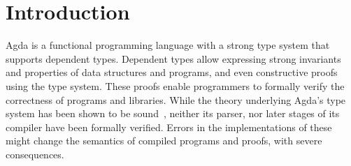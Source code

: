 \chapter{Introduction}


%

	Agda is a functional programming language with a strong type system that
	supports dependent types. Dependent types allow expressing strong
	invariants and properties of data structures and programs, and even
	constructive proofs using the type system. These proofs enable programmers
	to formally verify the correctness of programs and libraries. While the
	theory underlying Agda's type system has been shown to be
	sound~\cite{martin84}, neither its parser, nor later stages of its compiler
	have been formally verified. Errors in the implementations of these might
	change the semantics of compiled programs and proofs, with severe
	consequences.

